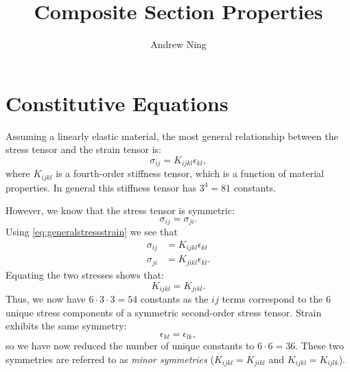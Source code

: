 \documentclass{article}
\begin{document}
\title{Composite Section Properties}
\author{Andrew Ning}
\date{}
\maketitle

\section{Constitutive Equations}

Assuming a linearly elastic material, the most general relationship between the stress tensor and the strain tensor is:
\begin{equation}
\sigma_{ij} = K_{ijkl} \epsilon_{kl},
\label{eq:generalstressstrain}
\end{equation}
where $K_{ijkl}$ is a fourth-order stiffness tensor, which is a function of material properties.  In general this stiffness tensor has $3^4 = 81$ constants.

However, we know that the stress tensor is symmetric:
\begin{equation}
\sigma_{ij} = \sigma_{ji}.
\end{equation}
Using \cref{eq:generalstressstrain} we see that
\begin{align}
\sigma_{ij} &= K_{ijkl} \epsilon_{kl}\\
\sigma_{ji} &= K_{jikl} \epsilon_{kl}.
\end{align}
Equating the two stresses shows that:
\begin{equation}
K_{ijkl} = K_{jikl}.
\end{equation}
Thus, we now have $6 \cdot 3 \cdot 3 = 54$ constants as the $ij$ terms correspond to the 6 unique stress components of a symmetric second-order stress tensor.  Strain exhibits the same symmetry:
\begin{equation}
\epsilon_{kl} = \epsilon_{lk},
\end{equation}
so we have now reduced the number of unique constants to $6 \cdot 6 = 36$.
These two symmetries are referred to as \emph{minor symmetries} ($K_{ijkl} = K_{jikl}$ and $K_{ijkl} = K_{ijlk}$).
\end{document}
